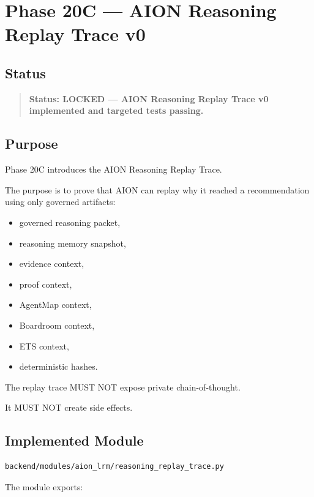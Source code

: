 \section{Phase 20C --- AION Reasoning Replay Trace v0}
\label{sec:phase20c-aion-reasoning-replay-trace-v0}

\subsection{Status}

\begin{quote}
\textbf{Status: LOCKED --- AION Reasoning Replay Trace v0 implemented and targeted tests passing.}
\end{quote}

\subsection{Purpose}

Phase 20C introduces the AION Reasoning Replay Trace.

The purpose is to prove that AION can replay why it reached a recommendation using only governed artifacts:

\begin{itemize}
  \item governed reasoning packet,
  \item reasoning memory snapshot,
  \item evidence context,
  \item proof context,
  \item AgentMap context,
  \item Boardroom context,
  \item ETS context,
  \item deterministic hashes.
\end{itemize}

The replay trace MUST NOT expose private chain-of-thought.

It MUST NOT create side effects.

\subsection{Implemented Module}

\begin{verbatim}
backend/modules/aion_lrm/reasoning_replay_trace.py
\end{verbatim}

The module exports:

